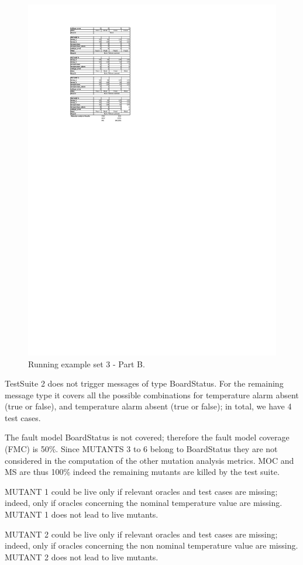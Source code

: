 \begin{figure}[tb]
\centering
\includegraphics[width=18cm]{damat/DataDrivenExample3B}
\caption{Running example set 3 - Part B.}
\label{fig:damat:RunningExample3B}
\end{figure}

TestSuite 2 does not trigger messages of type BoardStatus. For the remaining message type it covers all the possible combinations for temperature alarm absent (true or false), and temperature alarm absent (true or false); in total, we have 4 test cases.

The fault model BoardStatus is not covered; therefore the fault model coverage (FMC) is 50\%. Since MUTANTS 3 to 6 belong to BoardStatus they are not considered in the computation of the other mutation analysis metrics. MOC and MS are thus 100\% indeed the remaining mutants are killed by the test suite.

MUTANT 1 could be live only if relevant oracles and test cases are missing; indeed, only if oracles concerning the nominal temperature value are missing. MUTANT 1 does not lead to live mutants.

MUTANT 2 could be live only if relevant oracles and test cases are missing; indeed, only if oracles concerning the non nominal temperature value are missing. MUTANT 2 does not lead to live mutants.